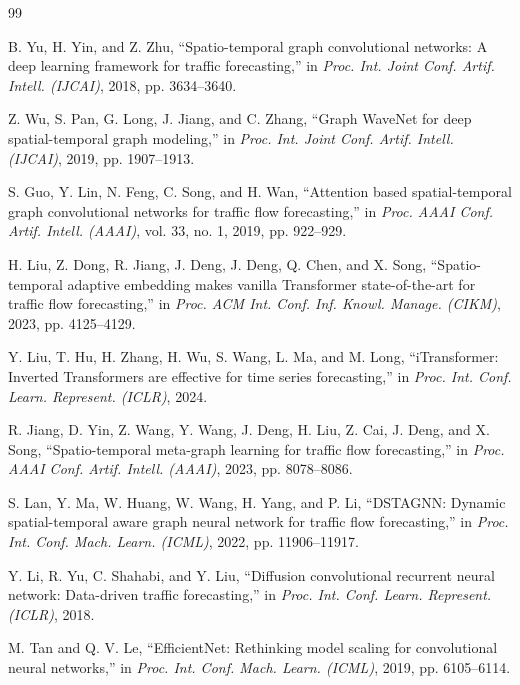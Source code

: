 \documentclass[12pt,a4paper,oneside]{report}
\begin{document}
\newpage
\begin{thebibliography}{99}

 B. Yu, H. Yin, and Z. Zhu, ``Spatio-temporal graph convolutional networks: A deep learning framework for traffic forecasting,'' in \textit{Proc. Int. Joint Conf. Artif. Intell. (IJCAI)}, 2018, pp. 3634--3640.

 Z. Wu, S. Pan, G. Long, J. Jiang, and C. Zhang, ``Graph WaveNet for deep spatial-temporal graph modeling,'' in \textit{Proc. Int. Joint Conf. Artif. Intell. (IJCAI)}, 2019, pp. 1907--1913.

 S. Guo, Y. Lin, N. Feng, C. Song, and H. Wan, ``Attention based spatial-temporal graph convolutional networks for traffic flow forecasting,'' in \textit{Proc. AAAI Conf. Artif. Intell. (AAAI)}, vol. 33, no. 1, 2019, pp. 922--929.

 H. Liu, Z. Dong, R. Jiang, J. Deng, J. Deng, Q. Chen, and X. Song, ``Spatio-temporal adaptive embedding makes vanilla Transformer state-of-the-art for traffic flow forecasting,'' in \textit{Proc. ACM Int. Conf. Inf. Knowl. Manage. (CIKM)}, 2023, pp. 4125--4129.

 Y. Liu, T. Hu, H. Zhang, H. Wu, S. Wang, L. Ma, and M. Long, ``iTransformer: Inverted Transformers are effective for time series forecasting,'' in \textit{Proc. Int. Conf. Learn. Represent. (ICLR)}, 2024.

 R. Jiang, D. Yin, Z. Wang, Y. Wang, J. Deng, H. Liu, Z. Cai, J. Deng, and X. Song, ``Spatio-temporal meta-graph learning for traffic flow forecasting,'' in \textit{Proc. AAAI Conf. Artif. Intell. (AAAI)}, 2023, pp. 8078--8086.

 S. Lan, Y. Ma, W. Huang, W. Wang, H. Yang, and P. Li, ``DSTAGNN: Dynamic spatial-temporal aware graph neural network for traffic flow forecasting,'' in \textit{Proc. Int. Conf. Mach. Learn. (ICML)}, 2022, pp. 11906--11917.

 Y. Li, R. Yu, C. Shahabi, and Y. Liu, ``Diffusion convolutional recurrent neural network: Data-driven traffic forecasting,'' in \textit{Proc. Int. Conf. Learn. Represent. (ICLR)}, 2018.

 M. Tan and Q. V. Le, ``EfficientNet: Rethinking model scaling for convolutional neural networks,'' in \textit{Proc. Int. Conf. Mach. Learn. (ICML)}, 2019, pp. 6105--6114.


\end{thebibliography}
\end{document}
